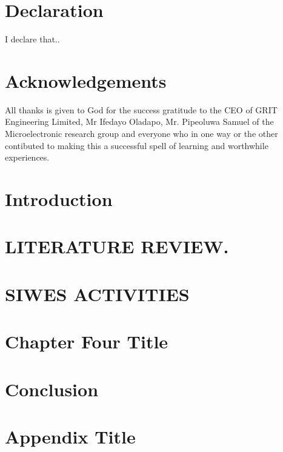 \documentclass[12pt,twoside]{report}
\begin{document}
\chapter*{Declaration}
I declare that..
 
\chapter*{Acknowledgements}
All thanks is given to God for the success gratitude to the CEO of GRIT Engineering Limited, Mr Ifedayo Oladapo, Mr. Pipeoluwa Samuel of the Microelectronic research group and everyone who in one way or the other contibuted to making this a successful spell of learning and worthwhile experiences.

 
\tableofcontents




\chapter{Introduction}

 
\chapter{LITERATURE REVIEW.}

 
\chapter{SIWES ACTIVITIES}

 
\chapter{Chapter Four Title}

 
\chapter{Conclusion}


\appendix
\chapter{Appendix Title}

\end{document}
